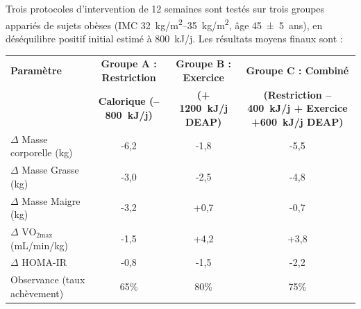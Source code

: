 \documentclass[11pt]{article}
\begin{document}
\begin{exercice}
Trois protocoles d'intervention de 12 semaines sont testés sur trois groupes appariés de sujets obèses (IMC \SIrange{32}{35}{kg/m^2}, âge \SI{45\pm5}{ans}), en déséquilibre positif initial estimé à \SI{+800}{kJ/j}. Les résultats moyens finaux sont :

\begin{center}
\begin{tabular}{|l|c|c|c|}
\hline
\textbf{Paramètre} & \textbf{Groupe A : Restriction} & \textbf{Groupe B : Exercice} & \textbf{Groupe C : Combiné} \\
& \textbf{Calorique (--\SI{800}{kJ/j})} & \textbf{(+ \SI{1200}{kJ/j} DEAP)} & \textbf{(Restriction --\SI{400}{kJ/j} + Exercice +\SI{600}{kJ/j} DEAP)} \\
\hline
$\Delta$ Masse corporelle (kg) & -6,2 & -1,8 & -5,5 \\
\hline
$\Delta$ Masse Grasse (kg) & -3,0 & -2,5 & -4,8 \\
\hline
$\Delta$ Masse Maigre (kg) & -3,2 & +0,7 & -0,7 \\
\hline
$\Delta$ VO$_{2\text{max}}$ (mL/min/kg) & -1,5 & +4,2 & +3,8 \\
\hline
$\Delta$ HOMA-IR & -0,8 & -1,5 & -2,2 \\
\hline
Observance (taux achèvement) & 65\% & 80\% & 75\% \\
\hline
\end{tabular}
\end{center}


\end{exercice}
\end{document}
